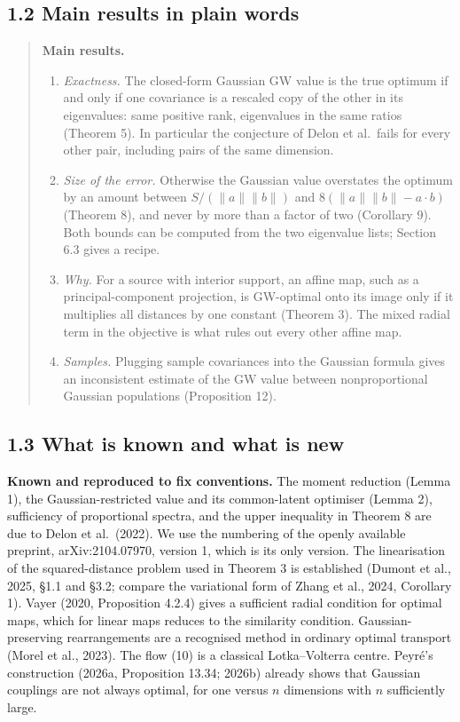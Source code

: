 \documentclass[
  british,
  11pt,
  a4paper,
]{article}
\providecommand{\tightlist}{%
  \setlength{\itemsep}{0pt}\setlength{\parskip}{0pt}}
\begin{document}
\subsection{1.2 Main results in plain
words}\label{main-results-in-plain-words}

\begin{quote}
\textbf{Main results.}

\begin{enumerate}
\def\labelenumi{\arabic{enumi}.}
\tightlist
\item
  \emph{Exactness.} The closed-form Gaussian GW value is the true
  optimum if and only if one covariance is a rescaled copy of the other
  in its eigenvalues: same positive rank, eigenvalues in the same ratios
  (Theorem 5). In particular the conjecture of Delon et al.~fails for
  every other pair, including pairs of the same dimension.
\item
  \emph{Size of the error.} Otherwise the Gaussian value overstates the
  optimum by an amount between \(S/(\|a\|\|b\|)\) and
  \(8(\|a\|\|b\|-a\cdot b)\) (Theorem 8), and never by more than a
  factor of two (Corollary 9). Both bounds can be computed from the two
  eigenvalue lists; Section 6.3 gives a recipe.
\item
  \emph{Why.} For a source with interior support, an affine map, such as
  a principal-component projection, is GW-optimal onto its image only if
  it multiplies all distances by one constant (Theorem 3). The mixed
  radial term in the objective is what rules out every other affine map.
\item
  \emph{Samples.} Plugging sample covariances into the Gaussian formula
  gives an inconsistent estimate of the GW value between nonproportional
  Gaussian populations (Proposition 12).
\end{enumerate}
\end{quote}

\subsection{1.3 What is known and what is
new}\label{what-is-known-and-what-is-new}

\textbf{Known and reproduced to fix conventions.} The moment reduction
(Lemma 1), the Gaussian-restricted value and its common-latent optimiser
(Lemma 2), sufficiency of proportional spectra, and the upper inequality
in Theorem 8 are due to Delon et al.~(2022). We use the numbering of the
openly available preprint, arXiv:2104.07970, version 1, which is its
only version. The linearisation of the squared-distance problem used in
Theorem 3 is established (Dumont et al., 2025, §1.1 and §3.2; compare
the variational form of Zhang et al., 2024, Corollary 1). Vayer (2020,
Proposition 4.2.4) gives a sufficient radial condition for optimal maps,
which for linear maps reduces to the similarity condition.
Gaussian-preserving rearrangements are a recognised method in ordinary
optimal transport (Morel et al., 2023). The flow (10) is a classical
Lotka--Volterra centre. Peyré's construction (2026a, Proposition 13.34;
2026b) already shows that Gaussian couplings are not always optimal, for
one versus \(n\) dimensions with \(n\) sufficiently large.
\end{document}
